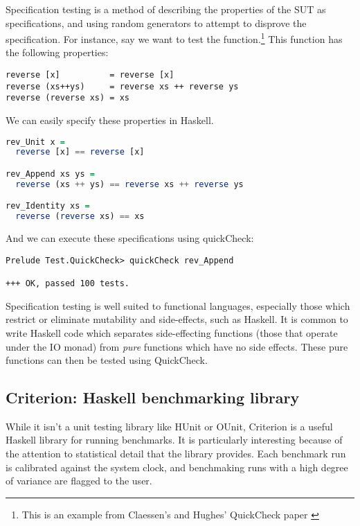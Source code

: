 Specification testing is a method of describing the properties of the
SUT as specifications, and using random generators to attempt to
disprove the specification. For instance, say we want to test the
 function.\footnote{This is an example from Claessen's
  and Hughes' QuickCheck paper \cite{claessen:quickcheck}} This
function has the following properties:

\footnotesize
\begin{verbatim}
reverse [x]          = reverse [x]
reverse (xs++ys)     = reverse xs ++ reverse ys
reverse (reverse xs) = xs
\end{verbatim}
\normalsize

We can easily specify these properties in Haskell.

\begin{lstlisting}[language=Haskell]
rev_Unit x =
  reverse [x] == reverse [x]

rev_Append xs ys =
  reverse (xs ++ ys) == reverse xs ++ reverse ys

rev_Identity xs =
  reverse (reverse xs) == xs
\end{lstlisting}

And we can execute these specifications using quickCheck:

\footnotesize
\begin{verbatim}
Prelude Test.QuickCheck> quickCheck rev_Append

+++ OK, passed 100 tests.
\end{verbatim}
\normalsize

Specification testing is well suited to functional languages,
especially those which restrict or eliminate mutability and
side-effects, such as Haskell. It is common to write Haskell code
which separates side-effecting functions (those that operate under the
IO monad) from \textit{pure} functions which have no side
effects. These pure functions can then be tested using QuickCheck. 

\subsection{Criterion: Haskell benchmarking library}

While it isn't a unit testing library like HUnit or OUnit, Criterion
\cite{www:criterion} is a useful Haskell library for running
benchmarks. It is particularly interesting because of the attention to
statistical detail that the library provides. Each benchmark run is
calibrated against the system clock, and benchmaking runs with a high
degree of variance are flagged to the user.

